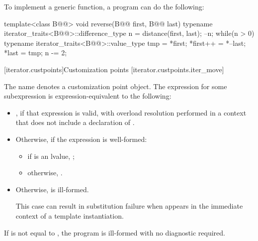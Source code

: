 \pnum
\begin{example}
To implement a generic
function, a \Cpp{} program can do the following:

\begin{codeblock}
template<class B@@>
void reverse(B@@ first, B@@ last) {
  typename iterator_traits<B@@>::difference_type n =
    distance(first, last);
  --n;
  while(n > 0) {
    typename iterator_traits<B@@>::value_type
     tmp = *first;
    *first++ = *--last;
    *last = tmp;
    n -= 2;
  }
}
\end{codeblock}
\end{example}

\begin{addedblock}
[iterator.custpoints]{Customization points}
[iterator.custpoints.iter_move]{}

\pnum
The name  denotes
a customization point object.
The expression  for some subexpression  is
expression-equivalent to the following:

\begin{itemize}
\item {}, if that expression is valid, with overload
resolution performed in a context that does not include a declaration of
.

\item Otherwise, if the expression  is well-formed:
\begin{itemize}
\item if  is an lvalue, ;

\item otherwise, .
\end{itemize}

\item Otherwise,  is ill-formed.
  \begin{note}
  This case can result in substitution failure when 
  appears in the immediate context of a template instantiation.
  \end{note}
\end{itemize}

\pnum
If  is not equal to , the program is
ill-formed with no diagnostic required.


\end{addedblock}
